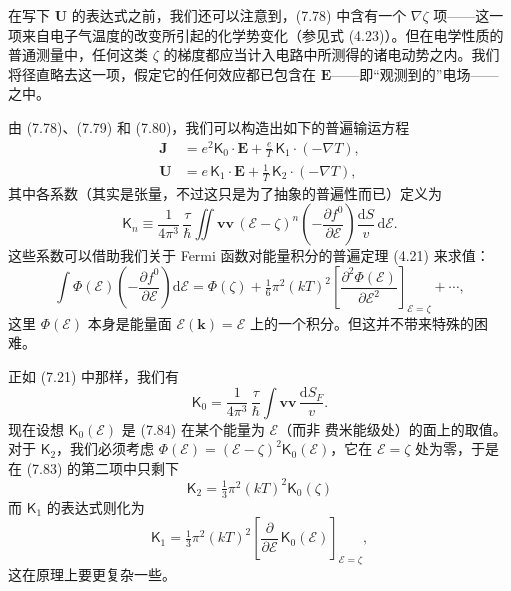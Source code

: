 在写下 $\mathbf{U}$ 的表达式之前，我们还可以注意到，(7.78) 中含有一个 $\nabla\zeta$ 项——这一项来自电子气温度的改变所引起的化学势变化（参见式 (4.23)）。但在电学性质的普通测量中，任何这类 $\zeta$ 的梯度都应当计入电路中所测得的诸电动势之内。我们将径直略去这一项，假定它的任何效应都已包含在 $\mathbf{E}$——即“观测到的”电场——之中。

由 (7.78)、(7.79) 和 (7.80)，我们可以构造出如下的普遍输运方程
\begin{align*}
\mathbf{J}&=e^{2}\mathsf{K}_{0}\cdot\mathbf{E}+\frac{e}{T}\,\mathsf{K}_{1}\cdot(-\nabla T),\tag{7.81a}\\
\mathbf{U}&=e\,\mathsf{K}_{1}\cdot\mathbf{E}+\frac{1}{T}\,\mathsf{K}_{2}\cdot(-\nabla T),\tag{7.81b}
\end{align*}
其中各系数（其实是张量，不过这只是为了抽象的普遍性而已）定义为
\begin{equation*}
\mathsf{K}_{n}\equiv\frac{1}{4\pi^{3}}\,\frac{\tau}{\hbar}\iint\mathbf{v}\mathbf{v}\,(\mathcal{E}-\zeta)^{n}\left(-\frac{\partial f^{0}}{\partial\mathcal{E}}\right)\frac{\mathrm{d}S}{v}\,\mathrm{d}\mathcal{E}.\tag{7.82}
\end{equation*}
这些系数可以借助我们关于 Fermi 函数对能量积分的普遍定理 (4.21) 来求值：
\begin{equation*}
\int\Phi(\mathcal{E})\left(-\frac{\partial f^{0}}{\partial\mathcal{E}}\right)\mathrm{d}\mathcal{E}=\Phi(\zeta)+\tfrac{1}{6}\pi^{2}(kT)^{2}\left[\frac{\partial^{2}\Phi(\mathcal{E})}{\partial\mathcal{E}^{2}}\right]_{\mathcal{E}=\zeta}+\cdots,\tag{7.83}
\end{equation*}
这里 $\Phi(\mathcal{E})$ 本身是能量面 $\mathcal{E}(\mathbf{k})=\mathcal{E}$ 上的一个积分。但这并不带来特殊的困难。

正如 (7.21) 中那样，我们有
\begin{equation*}
\mathsf{K}_{0}=\frac{1}{4\pi^{3}}\,\frac{\tau}{\hbar}\int\mathbf{v}\mathbf{v}\,\frac{\mathrm{d}S_{F}}{v}.\tag{7.84}
\end{equation*}
现在设想 $\mathsf{K}_{0}(\mathcal{E})$ 是 (7.84) 在某个能量为 $\mathcal{E}$（而非 费米能级处）的面上的取值。对于 $\mathsf{K}_{2}$，我们必须考虑 $\Phi(\mathcal{E})=(\mathcal{E}-\zeta)^{2}\mathsf{K}_{0}(\mathcal{E})$，它在 $\mathcal{E}=\zeta$ 处为零，于是在 (7.83) 的第二项中只剩下
\begin{equation*}
\mathsf{K}_{2}=\tfrac{1}{3}\pi^{2}(kT)^{2}\mathsf{K}_{0}(\zeta)\tag{7.85}
\end{equation*}
而 $\mathsf{K}_{1}$ 的表达式则化为
\begin{equation*}
\mathsf{K}_{1}=\tfrac{1}{3}\pi^{2}(kT)^{2}\left[\frac{\partial}{\partial\mathcal{E}}\,\mathsf{K}_{0}(\mathcal{E})\right]_{\mathcal{E}=\zeta},\tag{7.86}
\end{equation*}
这在原理上要更复杂一些。

